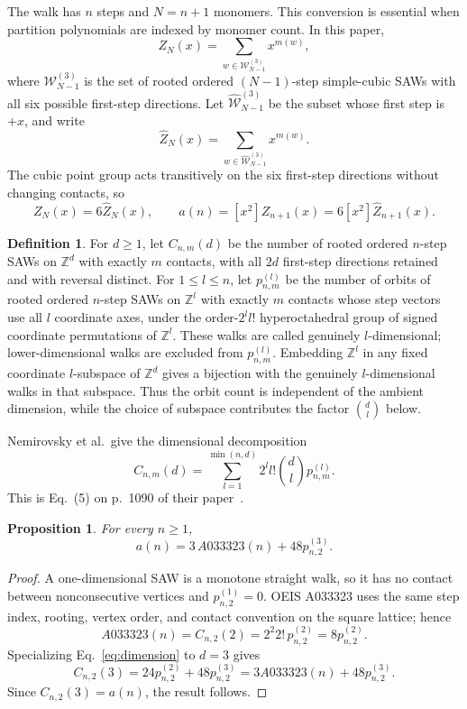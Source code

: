 \documentclass[11pt]{article}
\newtheorem{proposition}[theorem]{Proposition}
\theoremstyle{definition}
\newtheorem{definition}[theorem]{Definition}
\theoremstyle{remark}
\begin{document}
The walk has $n$ steps and $N=n+1$ monomers.  This conversion is essential
when partition polynomials are indexed by monomer count.  In this paper,
\[
 Z_N(x)=\sum_{w\in\mathcal W_{N-1}^{(3)}}x^{m(w)},
\]
where $\mathcal W_{N-1}^{(3)}$ is the set of rooted ordered $(N-1)$-step
simple-cubic SAWs with all six possible first-step directions.  Let
$\widehat{\mathcal W}_{N-1}^{(3)}$ be the subset whose first step is $+x$, and
write
\[
 \widehat Z_N(x)=
 \sum_{w\in\widehat{\mathcal W}_{N-1}^{(3)}}x^{m(w)}.
\]
The cubic point group acts transitively on the six first-step directions
without changing contacts, so
\[
 Z_N(x)=6\widehat Z_N(x),\qquad
 a(n)=[x^2]Z_{n+1}(x)=6[x^2]\widehat Z_{n+1}(x).
\]

\begin{definition}
For $d\geq1$, let $C_{n,m}(d)$ be the number of rooted ordered $n$-step SAWs
on $\mathbb Z^d$ with exactly $m$ contacts, with all $2d$ first-step
directions retained and with reversal distinct.  For $1\leq l\leq n$, let
$p_{n,m}^{(l)}$ be the number of orbits of rooted ordered $n$-step SAWs on
$\mathbb Z^l$ with exactly $m$ contacts whose step vectors use all $l$
coordinate axes, under the order-$2^l l!$ hyperoctahedral group of signed
coordinate permutations of $\mathbb Z^l$.  These walks are called genuinely
$l$-dimensional; lower-dimensional walks are excluded from $p_{n,m}^{(l)}$.
Embedding $\mathbb Z^l$ in any fixed coordinate $l$-subspace of $\mathbb Z^d$
gives a bijection with the genuinely $l$-dimensional walks in that subspace.
Thus the orbit count is independent of the ambient dimension, while the
choice of subspace contributes the factor $\binom dl$ below.
\end{definition}

Nemirovsky et al.\ give the dimensional decomposition
\begin{equation}
 C_{n,m}(d)=\sum_{l=1}^{\min(n,d)}2^l l!\binom dl p_{n,m}^{(l)}.
 \label{eq:dimension}
\end{equation}
This is Eq.~(5) on p.~1090 of their paper~\cite{NemirovskyEtAl1992}.

\begin{proposition}
For every $n\geq1$,
\begin{equation}
 a(n)=3\,A033323(n)+48p_{n,2}^{(3)}.
 \label{eq:reconstruction}
\end{equation}
\end{proposition}

\begin{proof}
A one-dimensional SAW is a monotone straight walk, so it has no contact
between nonconsecutive vertices and $p_{n,2}^{(1)}=0$.  OEIS A033323 uses the
same step index, rooting, vertex order, and contact convention on the square
lattice; hence
\[
 A033323(n)=C_{n,2}(2)=2^2 2!\,p_{n,2}^{(2)}=8p_{n,2}^{(2)}.
\]
Specializing Eq.~\eqref{eq:dimension} to $d=3$ gives
\[
 C_{n,2}(3)=24p_{n,2}^{(2)}+48p_{n,2}^{(3)}
           =3A033323(n)+48p_{n,2}^{(3)}.
\]
Since $C_{n,2}(3)=a(n)$, the result follows.
\end{proof}
\end{document}
